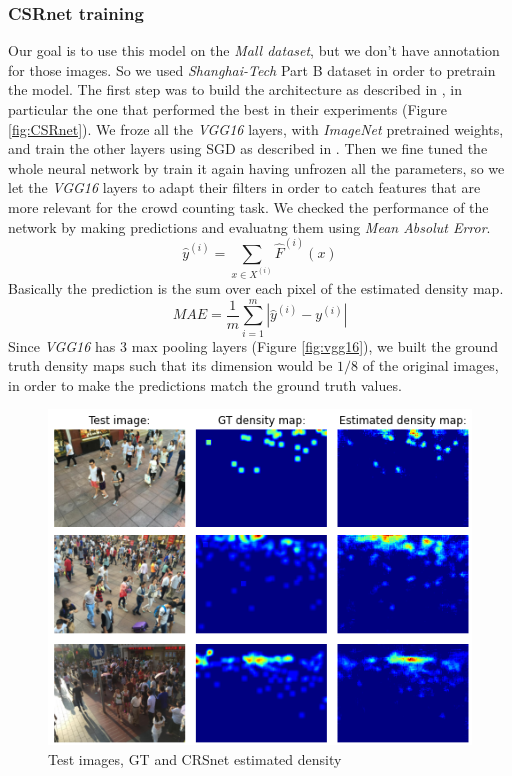 \documentclass[10pt,twocolumn,letterpaper]{article}
\begin{document}
\subsubsection{CSRnet training}
Our goal is to use this model on the \textit{Mall dataset}, but we don't have annotation for those images. So we used \textit{Shanghai-Tech} Part B dataset in order to pretrain the model. The first step was to build the architecture as described in \cite{li2018csrnet}, in particular the one that performed the best in their experiments (Figure \ref{fig:CSRnet}). We froze all the \textit{VGG16} layers, with \textit{ImageNet} pretrained weights, and train the other layers using SGD as described in \cite{li2018csrnet}. Then we fine tuned the whole neural network by train it again having unfrozen all the parameters, so we let the \textit{VGG16} layers to adapt their filters in order to catch features that are more relevant for the crowd counting task. We checked the performance of the network by making predictions and evaluatng them using \textit{Mean Absolut Error}.
\begin{equation}
	\hat{y}^{(i)} = \sum_{x \in X^{(i)}}\hat{F}^{(i)}(x)
\end{equation}
Basically the prediction is the sum over each pixel of the estimated density map.
\begin{equation}
	MAE = \frac{1}{m}  \sum_{i = 1}^{m} |\hat{y}^{(i)} - y^{(i)}|
\end{equation}
Since \textit{VGG16} has 3 max pooling layers (Figure \ref{fig:vgg16}), we built the ground truth density maps such that its dimension would be $1/8$ of the original images, in order to make the predictions match the ground truth values.


\begin{figure}[h!]
	\includegraphics[width=\linewidth]{pics/DMpred.png}
	\caption{Test images, GT and CRSnet estimated density}
	\label{fig:DMpred}
\end{figure}
\end{document}
